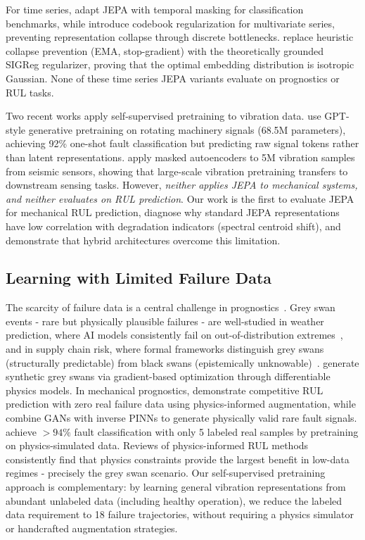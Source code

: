 For time series, \citet{tsjepa2024} adapt JEPA with temporal masking for classification benchmarks, while \citet{mtsjepa2026} introduce codebook regularization for multivariate series, preventing representation collapse through discrete bottlenecks. \citet{balestriero2025lejepa} replace heuristic collapse prevention (EMA, stop-gradient) with the theoretically grounded SIGReg regularizer, proving that the optimal embedding distribution is isotropic Gaussian. None of these time series JEPA variants evaluate on prognostics or RUL tasks.

Two recent works apply self-supervised pretraining to vibration data. \citet{wang2025rmgpt} use GPT-style generative pretraining on rotating machinery signals (68.5M parameters), achieving 92\% one-shot fault classification but predicting raw signal tokens rather than latent representations. \citet{openMAE2025} apply masked autoencoders to 5M vibration samples from seismic sensors, showing that large-scale vibration pretraining transfers to downstream sensing tasks. However, \emph{neither applies JEPA to mechanical systems, and neither evaluates on RUL prediction}. Our work is the first to evaluate JEPA for mechanical RUL prediction, diagnose why standard JEPA representations have low correlation with degradation indicators (spectral centroid shift), and demonstrate that hybrid architectures overcome this limitation.

\subsection{Learning with Limited Failure Data}
\label{sec:related_rare}

The scarcity of failure data is a central challenge in prognostics~\citep{weak_supervision_phm2025}. Grey swan events - rare but physically plausible failures - are well-studied in weather prediction, where AI models consistently fail on out-of-distribution extremes~\citep{greyswan_weather2024}, and in supply chain risk, where formal frameworks distinguish grey swans (structurally predictable) from black swans (epistemically unknowable)~\citep{greyswan_supplychain2025}. \citet{greyswan_factory2026} generate synthetic grey swans via gradient-based optimization through differentiable physics models. In mechanical prognostics, \citet{physics_augment_rul2024} demonstrate competitive RUL prediction with zero real failure data using physics-informed augmentation, while \citet{deng2025gan_pinn} combine GANs with inverse PINNs to generate physically valid rare fault signals. \citet{digitaltwin_bearing2025} achieve $>94\%$ fault classification with only 5 labeled real samples by pretraining on physics-simulated data. Reviews of physics-informed RUL methods~\citep{physics_rul_review2024} consistently find that physics constraints provide the largest benefit in low-data regimes - precisely the grey swan scenario. Our self-supervised pretraining approach is complementary: by learning general vibration representations from abundant unlabeled data (including healthy operation), we reduce the labeled data requirement to 18 failure trajectories, without requiring a physics simulator or handcrafted augmentation strategies.
